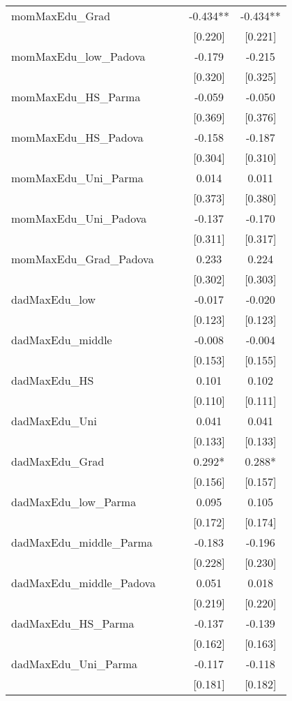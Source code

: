 \documentclass[]{article}
\begin{document}
\begin{tabular}{lcccc}
momMaxEdu\_Grad &  &  & -0.434** & -0.434** \\
 &  &  & [0.220] & [0.221] \\
momMaxEdu\_low\_Padova &  &  & -0.179 & -0.215 \\
 &  &  & [0.320] & [0.325] \\
momMaxEdu\_HS\_Parma &  &  & -0.059 & -0.050 \\
 &  &  & [0.369] & [0.376] \\
momMaxEdu\_HS\_Padova &  &  & -0.158 & -0.187 \\
 &  &  & [0.304] & [0.310] \\
momMaxEdu\_Uni\_Parma &  &  & 0.014 & 0.011 \\
 &  &  & [0.373] & [0.380] \\
momMaxEdu\_Uni\_Padova &  &  & -0.137 & -0.170 \\
 &  &  & [0.311] & [0.317] \\
momMaxEdu\_Grad\_Padova &  &  & 0.233 & 0.224 \\
 &  &  & [0.302] & [0.303] \\
dadMaxEdu\_low &  &  & -0.017 & -0.020 \\
 &  &  & [0.123] & [0.123] \\
dadMaxEdu\_middle &  &  & -0.008 & -0.004 \\
 &  &  & [0.153] & [0.155] \\
dadMaxEdu\_HS &  &  & 0.101 & 0.102 \\
 &  &  & [0.110] & [0.111] \\
dadMaxEdu\_Uni &  &  & 0.041 & 0.041 \\
 &  &  & [0.133] & [0.133] \\
dadMaxEdu\_Grad &  &  & 0.292* & 0.288* \\
 &  &  & [0.156] & [0.157] \\
dadMaxEdu\_low\_Parma &  &  & 0.095 & 0.105 \\
 &  &  & [0.172] & [0.174] \\
dadMaxEdu\_middle\_Parma &  &  & -0.183 & -0.196 \\
 &  &  & [0.228] & [0.230] \\
dadMaxEdu\_middle\_Padova &  &  & 0.051 & 0.018 \\
 &  &  & [0.219] & [0.220] \\
dadMaxEdu\_HS\_Parma &  &  & -0.137 & -0.139 \\
 &  &  & [0.162] & [0.163] \\
dadMaxEdu\_Uni\_Parma &  &  & -0.117 & -0.118 \\
 &  &  & [0.181] & [0.182] \\

\end{tabular}
\end{document}
